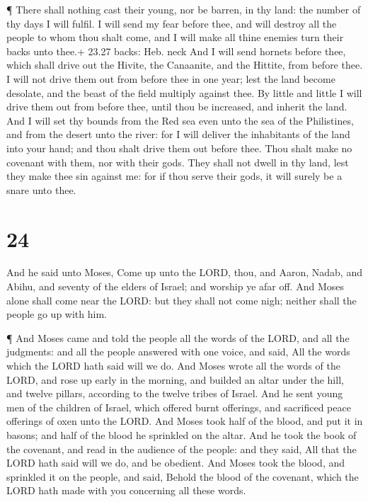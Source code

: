  ¶ There shall nothing cast their young, nor be barren, in
thy land: the number of thy days I will fulfil.  I will
send my fear before thee, and will destroy all the people to whom thou
shalt come, and I will make all thine enemies turn their backs unto
thee.+ 23.27 backs: Heb. neck  And I will send hornets
before thee, which shall drive out the Hivite, the Canaanite, and the
Hittite, from before thee.  I will not drive them out from
before thee in one year; lest the land become desolate, and the beast of
the field multiply against thee.  By little and little I
will drive them out from before thee, until thou be increased, and
inherit the land.  And I will set thy bounds from the Red
sea even unto the sea of the Philistines, and from the desert unto the
river: for I will deliver the inhabitants of the land into your hand;
and thou shalt drive them out before thee.  Thou shalt make
no covenant with them, nor with their gods.  They shall not
dwell in thy land, lest they make thee sin against me: for if thou serve
their gods, it will surely be a snare unto thee.

\hypertarget{section-23}{%
\section{24}\label{section-23}}

 And he said unto Moses, Come up unto the LORD, thou, and
Aaron, Nadab, and Abihu, and seventy of the elders of Israel; and
worship ye afar off.  And Moses alone shall come near the
LORD: but they shall not come nigh; neither shall the people go up with
him.

 ¶ And Moses came and told the people all the words of the
LORD, and all the judgments: and all the people answered with one voice,
and said, All the words which the LORD hath said will we do.
 And Moses wrote all the words of the LORD, and rose up
early in the morning, and builded an altar under the hill, and twelve
pillars, according to the twelve tribes of Israel.  And he
sent young men of the children of Israel, which offered burnt offerings,
and sacrificed peace offerings of oxen unto the LORD.  And
Moses took half of the blood, and put it in basons; and half of the
blood he sprinkled on the altar.  And he took the book of
the covenant, and read in the audience of the people: and they said, All
that the LORD hath said will we do, and be obedient.  And
Moses took the blood, and sprinkled it on the people, and said, Behold
the blood of the covenant, which the LORD hath made with you concerning
all these words.

